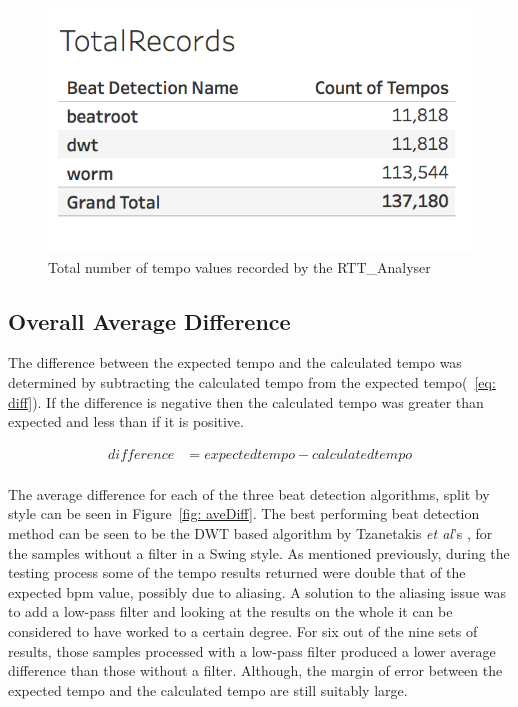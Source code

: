\documentclass[a4paper, 11pt]{article}
\begin{document}
\begin{figure}[htbp]
\centering
\includegraphics[scale=0.3]{totRec.jpg}
\caption{Total number of tempo values recorded by the RTT\_Analyser}
\label{fig: totrec}
\end{figure}

\subsection{Overall Average Difference}
The difference between the expected tempo and the calculated tempo was determined by subtracting the calculated tempo from the expected tempo(~\ref{eq: diff}). If the difference is negative then the calculated tempo was greater than expected and less than if it is positive.

\begin{equation}\label{eq: diff}
\begin{split}
difference& =expected tempo - calculated tempo\\
\end{split}
\end{equation}

The average difference for each of the three beat detection algorithms, split by style can be seen in Figure~\ref{fig: aveDiff}. The best performing beat detection method can be seen to be the DWT based algorithm by Tzanetakis \textit{et al}'s \cite{tzane1}, for the samples without a filter in a Swing style. As mentioned previously, during the testing process some of the tempo results returned were double that of the expected bpm value, possibly due to aliasing. A solution to the aliasing issue was to add a low-pass filter and looking at the results on the whole it can be considered to have worked to a certain degree. For six out of the nine sets of results, those samples processed with a low-pass filter produced a lower average difference than those without a filter. Although, the margin of error between the expected tempo and the calculated tempo are still suitably large.\par
\end{document}
